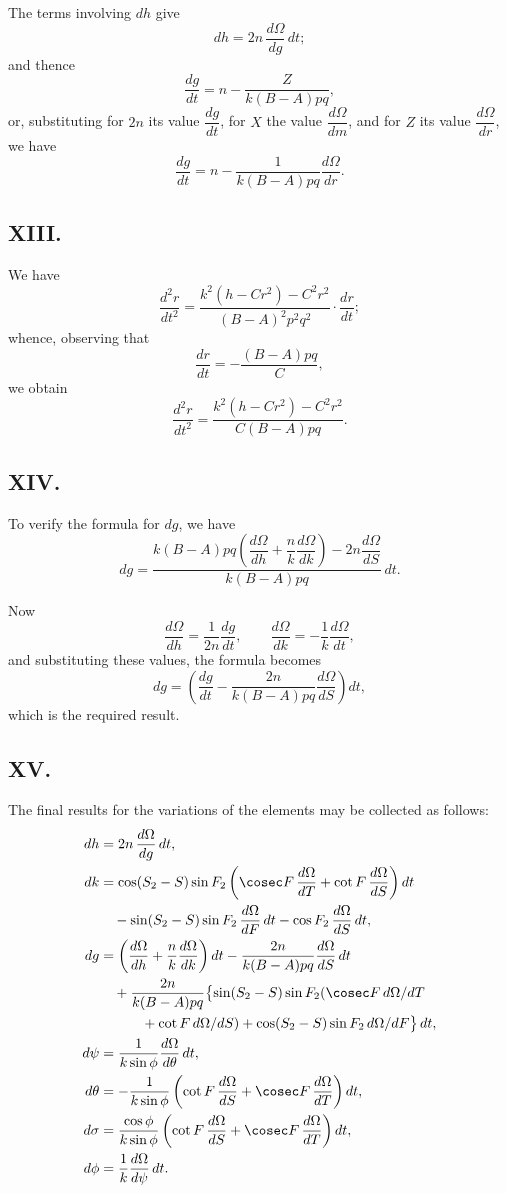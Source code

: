 \documentclass[11pt,a4paper]{book}
\begin{document}
The terms involving $dh$ give
\[
dh = 2n\,\frac{d\Omega}{dg}\,dt;
\]
and thence
\[
\frac{dg}{dt} = n - \frac{Z}{k(B-A)pq},
\]
or, substituting for $2n$ its value $\dfrac{dg}{dt}$, for $X$ the value $\dfrac{d\Omega}{dm}$, and for $Z$ its value $\dfrac{d\Omega}{dr}$, we have
\[
\frac{dg}{dt} = n - \frac{1}{k(B-A)pq}\frac{d\Omega}{dr}.
\]

\subsection*{XIII.}

We have
\[
\frac{d^2r}{dt^2} = \frac{k^2(h-Cr^2)-C^2r^2}{(B-A)^2p^2q^2}\cdot\frac{dr}{dt};
\]
whence, observing that
\[
\frac{dr}{dt} = -\frac{(B-A)pq}{C},
\]
we obtain
\[
\frac{d^2r}{dt^2} = \frac{k^2(h-Cr^2)-C^2r^2}{C(B-A)pq}.
\]

\subsection*{XIV.}

To verify the formula for $dg$, we have
\[
dg = \frac{k(B-A)pq\left(\dfrac{d\Omega}{dh} + \dfrac{n}{k}\dfrac{d\Omega}{dk}\right) - 2n\dfrac{d\Omega}{dS}}{k(B-A)pq}\,dt.
\]

Now
\[
\frac{d\Omega}{dh} = \frac{1}{2n}\frac{dg}{dt}, \qquad \frac{d\Omega}{dk} = -\frac{1}{k}\frac{d\Omega}{dt},
\]
and substituting these values, the formula becomes
\[
dg = \left(\frac{dg}{dt} - \frac{2n}{k(B-A)pq}\frac{d\Omega}{dS}\right)dt,
\]
which is the required result.

\subsection*{XV.}

The final results for the variations of the elements may be collected as follows:
\begin{align}
dh &= 2n\,\frac{d\Omega}{dg}\,dt, \\
dk &= \cos(S_2-S)\sin F_2\left(\cosec F\,\frac{d\Omega}{dT} + \cot F\,\frac{d\Omega}{dS}\right)dt \notag\\
&\quad - \sin(S_2-S)\sin F_2\,\frac{d\Omega}{dF}\,dt - \cos F_2\,\frac{d\Omega}{dS}\,dt, \\
dg &= \left(\frac{d\Omega}{dh} + \frac{n}{k}\frac{d\Omega}{dk}\right)dt - \frac{2n}{k(B-A)pq}\frac{d\Omega}{dS}\,dt \notag\\
&\quad + \frac{2n}{k(B-A)pq}\bigl\{\sin(S_2-S)\sin F_2(\cosec F\,d\Omega/dT \notag\\
&\quad\qquad + \cot F\,d\Omega/dS) + \cos(S_2-S)\sin F_2\,d\Omega/dF\bigr\}\,dt, \\
d\psi &= \frac{1}{k\sin\phi}\frac{d\Omega}{d\theta}\,dt, \\
d\theta &= -\frac{1}{k\sin\phi}\left(\cot F\,\frac{d\Omega}{dS} + \cosec F\,\frac{d\Omega}{dT}\right)dt, \\
d\sigma &= \frac{\cos\phi}{k\sin\phi}\left(\cot F\,\frac{d\Omega}{dS} + \cosec F\,\frac{d\Omega}{dT}\right)dt, \\
d\phi &= \frac{1}{k}\frac{d\Omega}{d\psi}\,dt.
\end{align}
\end{document}
